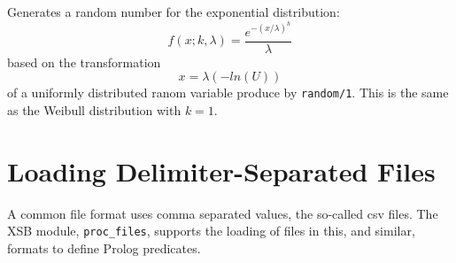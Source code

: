 \begin{description}
%
Generates a random number for the exponential distribution:
\[
  f(x;k,\lambda) = \frac{e^{-(x/\lambda)^h}}{\lambda}
\]
based on the transformation
\[
  x = \lambda(-ln(U))
\]
of a uniformly distributed ranom variable produce by {\tt random/1}.
This is the same as the Weibull distribution with $k = 1$.

\end{description}

\section{Loading Delimiter-Separated Files} \label{sec:procfiles}

A common file format uses comma separated values, the so-called csv
files.  The XSB module, {\tt proc\_files}, supports the loading of
files in this, and similar, formats to define Prolog predicates.

